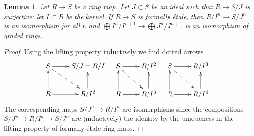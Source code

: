 \documentclass[10pt,a4paper]{amsart}
\theoremstyle{plain}
\newtheorem{lemma}[subsection]{Lemma}
\theoremstyle{definition}
\theoremstyle{remark}
\numberwithin{equation}{subsection}
\begin{document}
\begin{lemma}
\label{lemma-formally-etale-lift-infinitesimal}
Let $R \to S$ be a ring map. Let $J \subset S$ be an ideal such
that $R \to S/J$ is surjective; let $I \subset R$ be the kernel.
If $R \to S$ is formally \'etale, then $R/I^n \to S/J^n$ is an
isomorphism for all $n$ and
$\bigoplus I^n/I^{n + 1} \to \bigoplus J^n/J^{n + 1}$
is an isomorphism of graded rings.
\end{lemma}

\begin{proof}
Using the lifting property inductively we find dotted arrows
$$
\xymatrix{
S \ar[r] \ar@{-->}[rd] & S/J = R/I \\
R \ar[r] \ar[u] & R/I^2 \ar[u]
}
\quad
\xymatrix{
S \ar[r] \ar@{-->}[rd] & R/I^2 \\
R \ar[r] \ar[u] & R/I^3 \ar[u]
}
\quad
\xymatrix{
S \ar[r] \ar@{-->}[rd] & R/I^3 \\
R \ar[r] \ar[u] & R/I^4 \ar[u]
}
$$
The corresponding maps $S/J^n \to R/I^n$ are isomorphisms
since the compositions $S/J^n \to R/I^n \to S/J^n$ are
(inductively) the identity by the uniqueness in the lifting
property of formally \'etale ring maps.
\end{proof}
\end{document}
